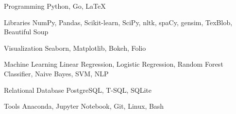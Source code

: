 

\begin{cvskills}
	
	\cvskill
	{Programming} %
	{Python, Go, LaTeX} %
	
	\cvskill
	{Libraries} %
	{NumPy, Pandas, Scikit-learn, SciPy, nltk, spaCy, gensim, TexBlob, Beautiful Soup
	} %
	
	\cvskill
	{Visualization} %
	{Seaborn, Matplotlib, Bokeh, Folio} %
	
	\cvskill
	{Machine Learning} %
	{Linear Regression, Logistic Regression, Random Forest Classifier, 
		Naive Bayes, SVM, NLP} %
	
	\cvskill
	{Relational Database} %
	{PostgreSQL, T-SQL, SQLite} %
	
	\cvskill
	{Tools} %
	{Anaconda, Jupyter Notebook, Git, Linux, Bash} %
	
	
	\vspace*{-12mm}
\end{cvskills}
